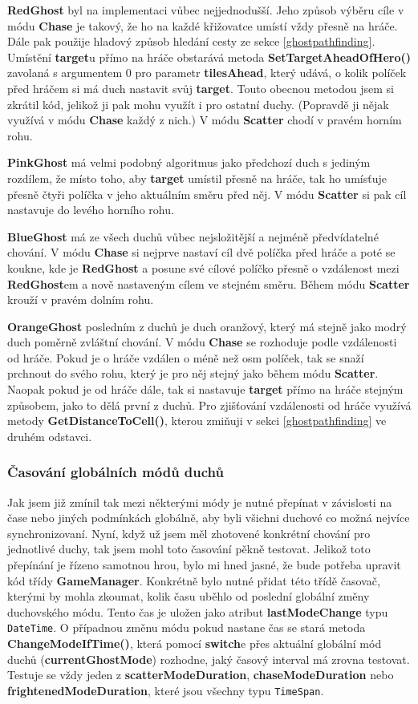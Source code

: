 \documentclass[a4]{article}
\begin{document}
\textbf{RedGhost} byl na implementaci vůbec nejjednodušší. Jeho způsob výběru cíle v módu \textbf{Chase} je takový, že ho na každé křižovatce umístí vždy přesně na hráče. Dále pak použije hladový způsob hledání cesty ze sekce \ref{ghostpathfinding}. Umístění \textbf{target}u přímo na hráče obstarává metoda \textbf{SetTargetAheadOfHero()} zavolaná s argumentem 0 pro parametr \textbf{tilesAhead}, který udává, o kolik políček před hráčem si má duch nastavit svůj \textbf{target}. Touto obecnou metodou jsem si zkrátil kód, jelikož ji pak mohu využít i pro ostatní duchy. (Popravdě ji nějak využívá v módu \textbf{Chase} každý z nich.) V módu \textbf{Scatter} chodí v pravém horním rohu.

\textbf{PinkGhost} má velmi podobný algoritmus jako předchozí duch s jediným rozdílem, že místo toho, aby \textbf{target} umístil přesně na hráče, tak ho umísťuje přesně čtyři políčka v jeho aktuálním směru před něj. V módu \textbf{Scatter} si pak cíl nastavuje do levého horního rohu.

\textbf{BlueGhost} má ze všech duchů vůbec nejsložitější a nejméně předvídatelné chování. V módu \textbf{Chase} si nejprve nastaví cíl dvě políčka před hráče a poté se koukne, kde je \textbf{RedGhost} a posune své cílové políčko přesně o vzdálenost mezi \textbf{RedGhost}em a nově nastaveným cílem ve stejném směru. Během módu \textbf{Scatter} krouží v pravém dolním rohu.

\textbf{OrangeGhost} posledním z duchů je duch oranžový, který má stejně jako modrý duch poměrně zvláštní chování. V módu \textbf{Chase} se rozhoduje podle vzdálenosti od hráče. Pokud je o hráče vzdálen o méně než osm políček, tak se snaží prchnout do svého rohu, který je pro něj stejný jako během módu \textbf{Scatter}. Naopak pokud je od hráče dále, tak si nastavuje \textbf{target} přímo na hráče stejným způsobem, jako to dělá první z duchů. Pro zjišťování vzdálenosti od hráče využívá metody \textbf{GetDistanceToCell()}, kterou zmiňuji v sekci \ref{ghostpathfinding} ve druhém odstavci.

\subsubsection{Časování globálních módů duchů} \label{globalmodetiming}
Jak jsem již zmínil tak mezi některými módy je nutné přepínat v závislosti na čase nebo jiných podmínkách globálně, aby byli všichni duchové co možná nejvíce synchronizovaní. Nyní, když už jsem měl zhotovené konkrétní chování pro jednotlivé duchy, tak jsem mohl toto časování pěkně testovat. Jelikož toto přepínání je řízeno samotnou hrou, bylo mi hned jasné, že bude potřeba upravit kód třídy \textbf{GameManager}. Konkrétně bylo nutné přidat této třídě časovač, kterými by mohla zkoumat, kolik času uběhlo od poslední globální změny duchovského módu. Tento čas je uložen jako atribut \textbf{lastModeChange} typu \verb|DateTime|. O případnou změnu módu pokud nastane čas se stará metoda \textbf{ChangeModeIfTime()}, která pomocí \textbf{switch}e přes aktuální globální mód duchů (\textbf{currentGhostMode}) rozhodne, jaký časový interval má zrovna testovat. Testuje se vždy jeden z \textbf{scatterModeDuration}, \textbf{chaseModeDuration} nebo \textbf{frightenedModeDuration}, které jsou všechny typu \verb|TimeSpan|. 
\end{document}
